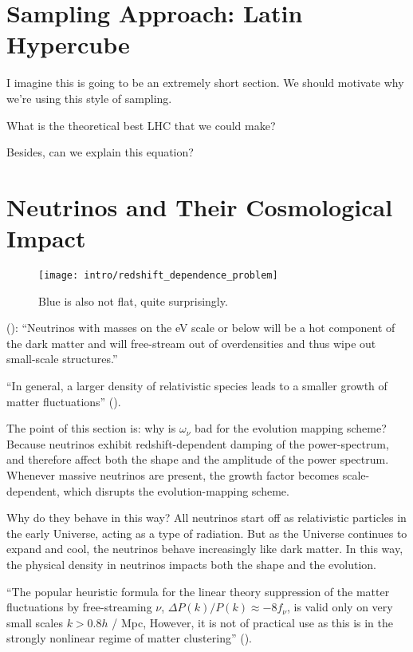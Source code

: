 \section{Sampling Approach: Latin Hypercube}
\label{sec: lhc_theory}

I imagine this is going to be an extremely short section. We should motivate why we're using this style of sampling.

What is the theoretical best LHC that we could make?

Besides, can we explain this equation?


\section{Neutrinos and Their Cosmological Impact}
\label{sec: neutrino_problem}

\begin{figure}[htb]
  \centering
  \texttt{[image: intro/redshift\_dependence\_problem]}
  \caption[Redshift Dependence of Neutrino Impact]{Blue is also not flat,
  	quite surprisingly.}
  \label{fig: neutrinos_and_redshift}
\end{figure}

(): ``Neutrinos with masses on the eV scale or below will be a
hot component of the dark matter and will free-stream out of overdensities and
thus wipe out small-scale structures.''

``In general, a larger density of relativistic species leads to a smaller
growth of matter fluctuations'' ().

The point of this section is: why is $\omega_\nu$ bad for the
evolution mapping scheme? Because neutrinos exhibit redshift-dependent
damping of the power-spectrum, and therefore affect both the shape and the
amplitude of the power spectrum. Whenever massive neutrinos are present,
the growth factor becomes scale-dependent, which disrupts the
evolution-mapping scheme.

Why do they behave in this way? All neutrinos start off as
relativistic particles in the early Universe, acting as a type of radiation.
But as the Universe continues to expand and cool, the neutrinos behave
increasingly like dark matter.
In this way, the physical density in neutrinos impacts both the shape and the
evolution.

``The popular heuristic formula for the linear theory suppression of the matter
fluctuations by free-streaming $\nu$, $\Delta P(k) / P(k) \approx -8 f_\nu$, is
valid only on very small scales $k > 0.8 h$ / Mpc, However, it is not of
practical use as this is in the strongly nonlinear regime of matter
clustering'' ().

